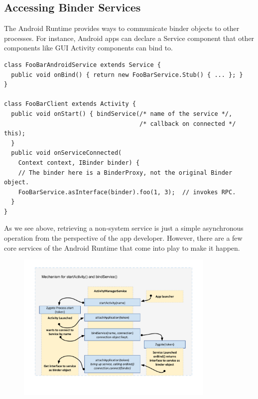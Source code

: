 \documentclass[prodmode]{acmlarge}
\begin{document}
\subsection{Accessing Binder Services}
The Android Runtime provides ways to communicate binder objects to other processes. For instance, Android apps can declare a Service component that other components like GUI Activity components can bind to.

\begin{Verbatim}[samepage=true]
class FooBarAndroidService extends Service {
  public void onBind() { return new FooBarService.Stub() { ... }; }
}

class FooBarClient extends Activity {
  public void onStart() { bindService(/* name of the service */,
                                      /* callback on connected */ this);
  }
  public void onServiceConnected(
    Context context, IBinder binder) {
    // The binder here is a BinderProxy, not the original Binder object.
    FooBarService.asInterface(binder).foo(1, 3);  // invokes RPC.
  }
}
\end{Verbatim}

As we see above, retrieving a non-system service is just a simple asynchronous operation from the perspective of the app developer. However, there are a few core services of the Android Runtime that come into play to make it happen.
\begin{figure}[h]
\centering
\includegraphics[width=0.85\textwidth]{drawings/bindService.pdf}
\end{figure}
\end{document}
